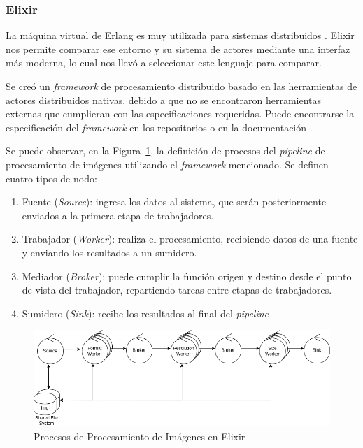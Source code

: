 \documentclass[11pt]{article}
\let\Oldsubsubsection\subsubsection
\renewcommand{\subsubsection}{\FloatBarrier\Oldsubsubsection}
\newcommand{\english}[1]{\textit{#1}}
\begin{document}
\subsubsection{Elixir}

La máquina virtual de Erlang es muy utilizada para sistemas distribuidos \cite{elx:ex:companies} \cite{scala:lib:rabbit}. Elixir nos permite comparar ese entorno y su sistema de actores mediante una interfaz más moderna, lo cual nos llevó a seleccionar este lenguaje para comparar.

Se creó un \english{framework} de procesamiento distribuido basado en las herramientas de actores distribuidos nativas, debido a que no se encontraron herramientas externas que cumplieran con las especificaciones requeridas. Puede encontrarse la especificación del \english{framework} en los repositorios o en la documentación \cite{repos:docs}.

Se puede observar, en la Figura~\ref{fig:elx:image_processing_framework}, la definición de procesos del \english{pipeline} de procesamiento de imágenes utilizando el \english{framework} mencionado. Se definen cuatro tipos de nodo:
\begin{enumerate}
\item Fuente (\english{Source}): ingresa los datos al sistema, que serán posteriormente enviados a la primera etapa de trabajadores.
    \item Trabajador (\english{Worker}): realiza el procesamiento, recibiendo datos de una fuente y enviando los resultados a un sumidero.
    \item Mediador (\english{Broker}): puede cumplir la función origen y destino desde el punto de vista del trabajador, repartiendo tareas entre etapas de trabajadores.
    \item  Sumidero (\english{Sink}): recibe los resultados al final del \english{pipeline}
\end{enumerate}

\begin{figure}[ht]
    \centering
    \includegraphics[scale=0.4]{resources/distributed_systems/elixir/image_processing_framework.png}
    \caption{Procesos de Procesamiento de Imágenes en Elixir}
    \label{fig:elx:image_processing_framework}
\end{figure}
\end{document}
